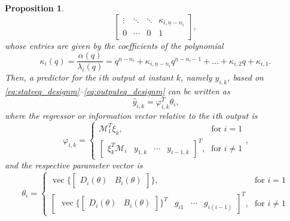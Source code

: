 \documentclass{tufte-handout}
\DeclareMathOperator{\stack}{vec}
\newtheorem{proposition}[theorem]{Proposition}
\begin{document}
\begin{proposition}
\begin{equation*}
\begin{bmatrix}
\vdots & \ddots & \ddots & \kappa_{i,\underline{n}-n_i} \\
0 & \cdots & 0 & 1
\end{bmatrix},
\end{equation*}
%
whose entries are given by the coefficients of the polynomial
%
\begin{equation*} %
\kappa_i(q) = \dfrac{\alpha(q)}{\lambda_i(q)} = q^{\underline{n}-n_i} + \kappa_{i,\underline{n}-n_i}q^{\underline{n}-n_i-1} + \ldots + \kappa_{i,2}q + \kappa_{i,1} \text{.}
\end{equation*}
%
Then, a predictor for the $i$th output at instant $k$, namely $\hat{y}_{i,k}$, based on \eqref{eq:stateeq_designm}--\eqref{eq:outputeq_designm} can be written as
\begin{equation} \label{eq:linear_reg}
\hat{y}_{i,k} = \varphi_{i,k}^T \theta_i \text{,} 
\end{equation}
where the regressor or information vector relative to the $i$th output is
\begin{equation*} %
\varphi_{i,k} = \left\{ \begin{array}{ll}
\mathcal{M}_1^T \xi_k \text{,} & \text{for } i = 1\\
\begin{bmatrix} \xi_k^T \mathcal{M}_i & y_{1,k} & \cdots & y_{i-1,k}\end{bmatrix}^T \text{,} & \text{for } i \neq 1
\end{array} \right. \text{,}
\end{equation*}
%
 and the respective parameter vector is
\setlength{\arraycolsep}{3.8pt}
\begin{equation*} %
\theta_i = \left\{ \begin{array}{ll}
\! \stack \{ \begin{bmatrix} D_{i}(\theta) & B_{i}(\theta) \end{bmatrix} \} \text{,} & \text{for } i = 1\\
\! \begin{bmatrix} \stack \{ \begin{bmatrix} D_{i}(\theta) & B_{i}(\theta) \end{bmatrix} \}^T & g_{i1} & \cdots & g_{i(i-1)} \end{bmatrix}^T \text{,} & \text{for } i \neq 1

\end{array}
\end{equation*}
\end{proposition}
\end{document}
